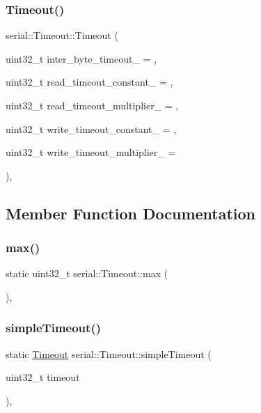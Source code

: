 \subsubsection{\texorpdfstring{Timeout()}{Timeout()}}
{\footnotesize\ttfamily serial\+::\+Timeout\+::\+Timeout (\begin{DoxyParamCaption}\item[{uint32\+\_\+t}]{inter\+\_\+byte\+\_\+timeout\+\_\+ = {},  }\item[{uint32\+\_\+t}]{read\+\_\+timeout\+\_\+constant\+\_\+ = {},  }\item[{uint32\+\_\+t}]{read\+\_\+timeout\+\_\+multiplier\+\_\+ = {},  }\item[{uint32\+\_\+t}]{write\+\_\+timeout\+\_\+constant\+\_\+ = {},  }\item[{uint32\+\_\+t}]{write\+\_\+timeout\+\_\+multiplier\+\_\+ = {} }\end{DoxyParamCaption})\hspace{0.3cm}{\ttfamily [inline]}, {\ttfamily [explicit]}}



\subsection{Member Function Documentation}
\mbox{\label{structserial_1_1_timeout_adc68e33d2f94bfa33ba1062c363b9151}} 
\subsubsection{\texorpdfstring{max()}{max()}}
{\footnotesize\ttfamily static uint32\+\_\+t serial\+::\+Timeout\+::max (\begin{DoxyParamCaption}{ }\end{DoxyParamCaption})\hspace{0.3cm}{\ttfamily [inline]}, {\ttfamily [static]}}

\mbox{\label{structserial_1_1_timeout_aa4fbd72e16f47c9aea9fb3c32ca17828}} 
\subsubsection{\texorpdfstring{simple\+Timeout()}{simpleTimeout()}}
{\footnotesize\ttfamily static \mbox{\hyperlink{structserial_1_1_timeout}{Timeout}} serial\+::\+Timeout\+::simple\+Timeout (\begin{DoxyParamCaption}\item[{uint32\+\_\+t}]{timeout }\end{DoxyParamCaption})\hspace{0.3cm}{\ttfamily [inline]}, {\ttfamily [static]}}

